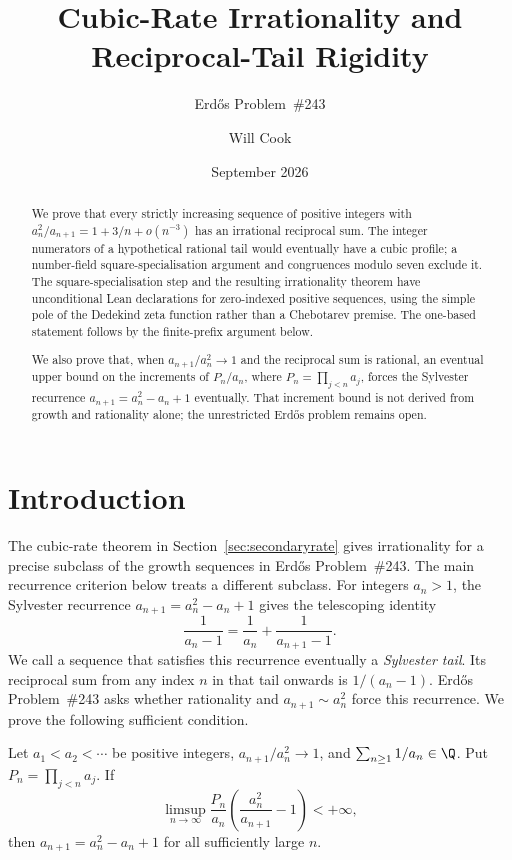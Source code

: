 \documentclass[11pt]{article}
\title{Cubic-Rate Irrationality and Reciprocal-Tail Rigidity}
\subtitle{Erd\H{o}s Problem~\#243}
\author{Will Cook}
\date{September 2026}
\begin{document}
\maketitle
\noteprovenance

\begin{abstract}
We prove that every strictly increasing sequence of positive integers with
$a_n^2/a_{n+1}=1+3/n+o(n^{-3})$ has an irrational reciprocal sum. The
integer numerators of a hypothetical rational tail would eventually have a
cubic profile; a number-field square-specialisation argument and congruences
modulo seven exclude it. The square-specialisation step and the resulting
irrationality theorem have unconditional Lean declarations for zero-indexed
positive sequences, using the simple pole of the Dedekind zeta function
rather than a Chebotarev premise. The one-based statement follows by the
finite-prefix argument below.

We also prove that, when $a_{n+1}/a_n^2\to1$ and the reciprocal sum is
rational, an eventual upper bound on the increments of
$P_n/a_n$, where $P_n=\prod_{j<n}a_j$, forces the Sylvester recurrence
$a_{n+1}=a_n^2-a_n+1$ eventually. That increment bound is not derived
from growth and rationality alone; the unrestricted Erd\H{o}s problem
remains open.
\end{abstract}

\section{Introduction}\label{sec:problem}
The cubic-rate theorem in Section~\ref{sec:secondaryrate} gives irrationality
for a precise subclass of the growth sequences in Erd\H{o}s Problem~\#243.
The main recurrence criterion below treats a different subclass.
For integers $a_n>1$, the Sylvester recurrence
$a_{n+1}=a_n^2-a_n+1$ gives the telescoping identity
\[
 \frac1{a_n-1}=\frac1{a_n}+\frac1{a_{n+1}-1}.
\]
We call a sequence that satisfies this recurrence eventually a
\emph{Sylvester tail}. Its reciprocal sum from any index $n$ in that
tail onwards is $1/(a_n-1)$. Erd\H{o}s Problem~\#243 asks whether rationality and
$a_{n+1}\sim a_n^2$ force this recurrence. We prove the following
sufficient condition.

\begin{corollary}\label{res:originalbounded}
Let $a_1<a_2<\cdots$ be positive integers, $a_{n+1}/a_n^2\to1$, and
$\sum_{n\ge1}1/a_n\in\Q$.  Put $P_n=\prod_{j<n}a_j$.  If
\[
 \limsup_{n\to\infty}\frac{P_n}{a_n}
 \left(\frac{a_n^2}{a_{n+1}}-1\right)<+\infty,
\]
then $a_{n+1}=a_n^2-a_n+1$ for all sufficiently large $n$.
\end{corollary}
\end{document}
